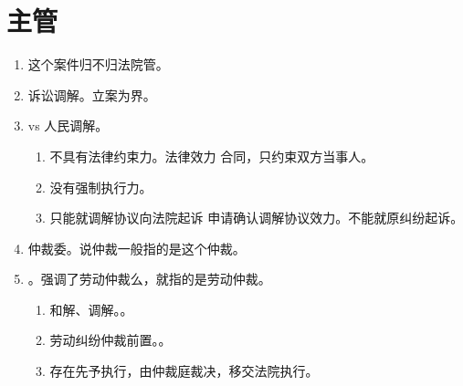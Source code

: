 \section{主管}
\begin{enumerate}
  \item 这个案件归不归法院管。
  \item 诉讼调解。立案为界。
  \item vs 人民调解。
        \begin{enumerate}
          \item 不具有法律约束力。法律效力 \ydy 合同，只约束双方当事人。
          \item 没有强制执行力。
          \item 只能就调解协议向法院起诉 \hz 申请确认调解协议效力。不能就原纠纷起诉。
        \end{enumerate}
  \item 仲裁委。说仲裁一般指的是这个仲裁。
  \item {}。强调了劳动仲裁么，就指的是劳动仲裁。
        \begin{enumerate}
          \item 和解、调解。。
          \item 劳动纠纷仲裁前置。。
          \item 存在先予执行，由仲裁庭裁决，移交法院执行。
        \end{enumerate}
\end{enumerate}
